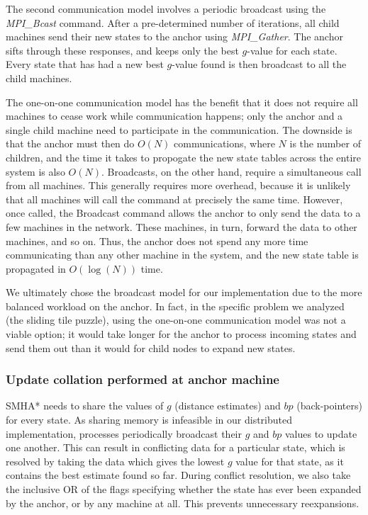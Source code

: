 \documentclass[11pt]{article}
\begin{document}
{The second communication model involves a periodic broadcast using the \emph{MPI\_Bcast} command. After a pre-determined number of iterations, all child machines send their new states to the anchor using \emph{MPI\_Gather}. The anchor sifts through these responses, and keeps only the best $g$-value for each state. Every state that has had a new best $g$-value found is then broadcast to all the child machines.

The one-on-one communication model has the benefit that it does not require all machines to cease work while communication happens; only the anchor and a single child machine need to participate in the communication. The downside is that the anchor must then do $O(N)$ communications, where $N$ is the number of children, and the time it takes to propogate the new state tables across the entire system is also $O(N)$. Broadcasts, on the other hand, require a simultaneous call from all machines. This generally requires more overhead, because it is unlikely that all machines will call the command at precisely the same time. However, once called, the Broadcast command allows the anchor to only send the data to a few machines in the network. These machines, in turn, forward the data to other machines, and so on. Thus, the anchor does not spend any more time communicating than any other machine in the system, and the new state table is propagated in $O(\log(N))$ time.

We ultimately chose the broadcast model for our implementation due to the more balanced workload on the anchor. In fact, in the specific problem we analyzed (the sliding tile puzzle), using the one-on-one communication model was not a viable option; it would take longer for the anchor to process incoming states and send them out than it would for child nodes to expand new states.

\subsubsection*{Update collation performed at anchor machine}

SMHA* needs to share the values of $g$ (distance estimates) and $bp$ (back-pointers) for every state. As sharing memory is infeasible in our distributed implementation, processes periodically broadcast their $g$ and $bp$ values to update one another. This can result in conflicting data for a particular state, which is resolved by taking the data which gives the lowest $g$ value for that state, as it contains the best estimate found so far. During conflict resolution, we also take the inclusive OR of the flags specifying whether the state has ever been expanded by the anchor, or by any machine at all. This prevents unnecessary reexpansions.

}
\end{document}
